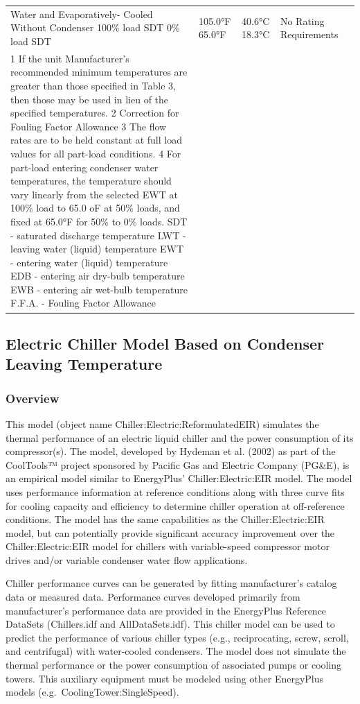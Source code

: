 \begin{longtable}[c]{p{1.2in}p{1.2in}p{1.2in}p{1.2in}p{1.2in}}
Water and Evaporatively-  Cooled Without  Condenser  100\% load SDT  0\% load SDT & 105.0°F  65.0°F & 40.6°C  18.3°C & No Rating Requirements \tabularnewline
1 If the unit Manufacturer’s recommended minimum temperatures are greater than those specified in  Table 3, then those may be used in lieu of the specified temperatures.  2 Correction for Fouling Factor Allowance  3 The flow rates are to be held constant at full load values for all part-load conditions.  4 For part-load entering condenser water temperatures, the temperature should vary linearly from  the selected  EWT at 100\% load to 65.0 oF at 50\% loads, and fixed at 65.0°F for 50\% to 0\% loads.  SDT - saturated discharge temperature  LWT - leaving water (liquid) temperature  EWT - entering water (liquid) temperature  EDB - entering air dry-bulb temperature  EWB - entering air wet-bulb temperature  F.F.A. - Fouling Factor Allowance \tabularnewline
\bottomrule
\end{longtable}

\subsection{Electric Chiller Model Based on Condenser Leaving Temperature}\label{electric-chiller-model-based-on-condenser-leaving-temperature}

\subsubsection{Overview}\label{overview-3-002}

This model (object name Chiller:Electric:ReformulatedEIR) simulates the thermal performance of an electric liquid chiller and the power consumption of its compressor(s). The model, developed by Hydeman et al. (2002) as part of the CoolTools™ project sponsored by Pacific Gas and Electric Company (PG\&E), is an empirical model similar to EnergyPlus' Chiller:Electric:EIR model. The model uses performance information at reference conditions along with three curve fits for cooling capacity and efficiency to determine chiller operation at off-reference conditions. The model has the same capabilities as the Chiller:Electric:EIR model, but can potentially provide significant accuracy improvement over the Chiller:Electric:EIR model for chillers with variable-speed compressor motor drives and/or variable condenser water flow applications.

Chiller performance curves can be generated by fitting manufacturer's catalog data or measured data. Performance curves developed primarily from manufacturer's performance data are provided in the EnergyPlus Reference DataSets (Chillers.idf and AllDataSets.idf). This chiller model can be used to predict the performance of various chiller types (e.g., reciprocating, screw, scroll, and centrifugal) with water-cooled condensers. The model does not simulate the thermal performance or the power consumption of associated pumps or cooling towers. This auxiliary equipment must be modeled using other EnergyPlus models (e.g.~CoolingTower:SingleSpeed).

